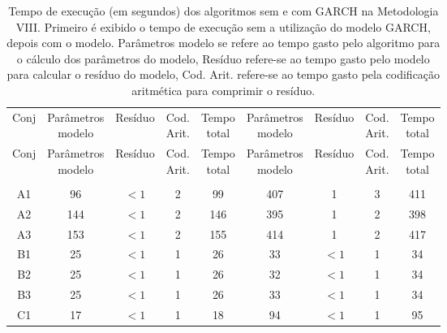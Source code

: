 \begin{center}
\begin{longtable}{ccccc|cccc}
\toprule
\rowcolor{white}
\caption[Metodologia VIII: tempo de execução]{Tempo de execução (em segundos)
dos algoritmos sem e com GARCH na Metodologia VIII. Primeiro é exibido o tempo de
execução sem a utilização do modelo GARCH, depois com o modelo. Parâmetros
modelo se refere ao tempo gasto pelo algoritmo para o cálculo dos parâmetros do
modelo, Resíduo refere-se ao tempo gasto pelo modelo para calcular o resíduo do
modelo, Cod. Arit. refere-se ao tempo gasto pela codificação aritmética para
comprimir o resíduo.} \label{tab:EvolucaoEntropiaMet8}\\
\midrule
Conj & \specialcell{Parâmetros\\modelo} &
Resíduo & \specialcell{Cod.\\Arit.} & \specialcell{Tempo\\total} &
\specialcell{Parâmetros\\modelo} &
Resíduo & \specialcell{Cod.\\Arit.} & \specialcell{Tempo\\total} \\
\midrule
\endfirsthead 
\midrule
\rowcolor{white}
Conj & \specialcell{Parâmetros\\modelo} &
Resíduo & \specialcell{Cod.\\Arit.} & \specialcell{Tempo\\total} &
\specialcell{Parâmetros\\modelo} &
Resíduo & \specialcell{Cod.\\Arit.} & \specialcell{Tempo\\total} \\
\toprule
\endhead
\midrule \\ %
\endfoot
\bottomrule 
\endlastfoot
A1&96&$<1$&2&99&407&1&3&411\\
A2&144&$<1$&2&146&395&1&2&398\\
A3&153&$<1$&2&155&414&1&2&417\\
B1&25&$<1$&1&26&33&$<1$&1&34\\
B2&25&$<1$&1&26&32&$<1$&1&34\\
B3&25&$<1$&1&26&33&$<1$&1&34\\
C1&17&$<1$&1&18&94&$<1$&1&95\\

\end{longtable}
\end{center}
